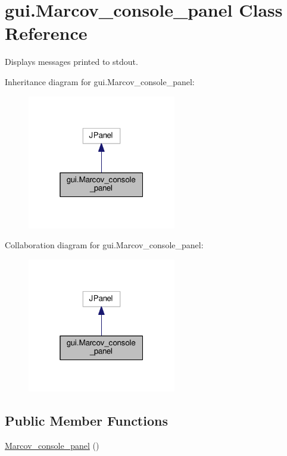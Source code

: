 \hypertarget{classgui_1_1_marcov__console__panel}{}\section{gui.\+Marcov\+\_\+console\+\_\+panel Class Reference}
\label{classgui_1_1_marcov__console__panel}


Displays messages printed to stdout.  




Inheritance diagram for gui.\+Marcov\+\_\+console\+\_\+panel\+:\nopagebreak
\begin{figure}[H]
\begin{center}
\leavevmode
\includegraphics[width=184pt]{classgui_1_1_marcov__console__panel__inherit__graph}
\end{center}
\end{figure}


Collaboration diagram for gui.\+Marcov\+\_\+console\+\_\+panel\+:\nopagebreak
\begin{figure}[H]
\begin{center}
\leavevmode
\includegraphics[width=184pt]{classgui_1_1_marcov__console__panel__coll__graph}
\end{center}
\end{figure}
\subsection*{Public Member Functions}
\begin{DoxyCompactItemize}
\item 
\hyperlink{classgui_1_1_marcov__console__panel_a7d160acfa85d8f3c3d49dcdde384e288}{Marcov\+\_\+console\+\_\+panel} ()
\end{DoxyCompactItemize}


